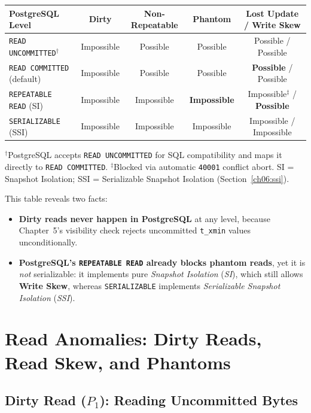 \begin{center}
\footnotesize
\begin{tabular}{@{}lcccc@{}}
\toprule
\textbf{PostgreSQL Level} & \textbf{Dirty} & \textbf{Non-Repeatable} & \textbf{Phantom} & \textbf{Lost Update / Write Skew} \\
\midrule
\texttt{READ UNCOMMITTED}$^{\dagger}$ & Impossible & Possible & Possible & Possible / Possible \\
\texttt{READ COMMITTED} (default) & Impossible & Possible & Possible & \textbf{Possible} / Possible \\
\texttt{REPEATABLE READ} (SI) & Impossible & Impossible & \textbf{Impossible} & Impossible$^{\ddagger}$ / \textbf{Possible} \\
\texttt{SERIALIZABLE} (SSI) & Impossible & Impossible & Impossible & Impossible / Impossible \\
\bottomrule
\end{tabular}
\end{center}
{\footnotesize $^{\dagger}$PostgreSQL accepts \texttt{READ UNCOMMITTED} for SQL compatibility and maps it directly to \texttt{READ COMMITTED}. $^{\ddagger}$Blocked via automatic \texttt{40001} conflict abort. SI = Snapshot Isolation; SSI = Serializable Snapshot Isolation (Section~\ref{ch06:ssi}).}

This table reveals two facts:
\begin{itemize}
  \item \textbf{Dirty reads never happen in PostgreSQL} at any level, because Chapter~5's visibility check rejects uncommitted \texttt{t\_xmin} values unconditionally.
  \item \textbf{PostgreSQL's \texttt{REPEATABLE READ} already blocks phantom reads}, yet it is \emph{not} serializable: it implements pure \emph{Snapshot Isolation} (\emph{SI}), which still allows \textbf{Write Skew}, whereas \texttt{SERIALIZABLE} implements \emph{Serializable Snapshot Isolation} (\emph{SSI}).
\end{itemize}

\section{Read Anomalies: Dirty Reads, Read Skew, and Phantoms}
\label{ch06:read-anomalies}

\subsection{Dirty Read ($P_1$): Reading Uncommitted Bytes}

